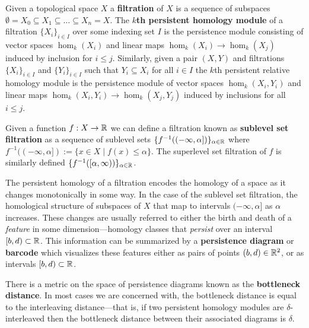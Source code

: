 
Given a topological space $X$ a \textbf{filtration} of $X$ is a sequence of subspaces $\emptyset = X_0\subseteq X_1\subseteq\ldots\subseteq X_n = X$.
The \textbf{$k$th persistent homology module} of a filtration $\{X_i\}_{i\in I}$ over some indexing set $I$ is the persistence module consisting of vector spaces $\hom_k(X_i)$ and linear maps $\hom_k(X_i)\to \hom_k(X_j)$ induced by inclusion for $i\leq j$.
Similarly, given a pair $(X,Y)$ and filtrations $\{X_i\}_{i\in I}$ and $\{Y_i\}_{i\in I}$ such that $Y_i\subseteq X_i$ for all $i\in I$ the $k$th persistent relative homology module is the persistence module of vector spaces $\hom_k(X_i, Y_i)$ and linear maps $\hom_k(X_i, Y_i)\to\hom_k(X_j, Y_j)$ induced by inclusions for all $i\leq j$.

Given a function $f: X\to \mathbb{R}$ we can define a filtration known as \textbf{sublevel set filtration} as a sequence of sublevel sets $\{f^{-1}((-\infty, \alpha])\}_{\alpha\in\mathbb{R}}$ where $f^{-1}((-\infty, \alpha]) := \{x\in X\mid f(x)\leq\alpha\}$.
The superlevel set filtration of $f$ is similarly defined $\{f^{-1}([\alpha,\infty))\}_{\alpha\in\mathbb{R}}$.

The persistent homology of a filtration encodes the homology of a space as it changes monotonically in some way.
In the case of the sublevel set filtration, the homological structure of subspaces of $X$ that map to intervals $(-\infty,\alpha]$ as $\alpha$ increases.
These changes are usually referred to either the birth and death of a \emph{feature} in some dimension---homology classes that \emph{persist} over an interval $[b, d)\subset\mathbb{R}$.
This information can be summarized by a \textbf{persistence diagram} or \textbf{barcode} which visualizes these features either as pairs of points $(b, d)\in\mathbb{R}^2$, or as intervals $[b, d)\subset\mathbb{R}$.

There is a metric on the space of persistence diagrams known as the \textbf{bottleneck distance}.
In most cases we are concerned with, the bottleneck distance is equal to the interleaving distance---that is, if two persistent homology modules are $\delta$-interleaved then the bottleneck distance between their associated diagrams is $\delta$.
